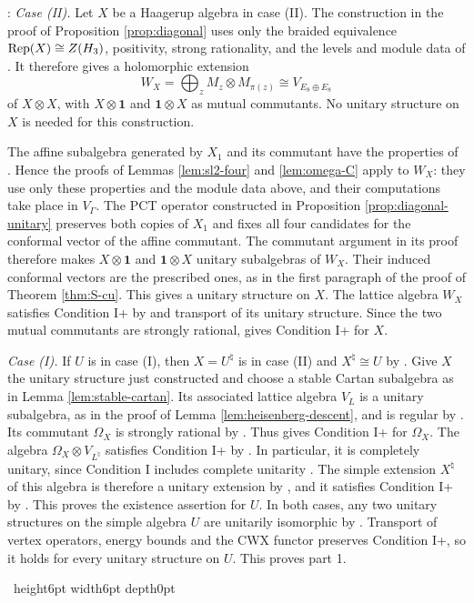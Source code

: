 \documentclass[leqno]{article}
\let\cal\relax
\newcommand{\cal}{\mathcal}
\newcommand{\qed}{\hfill \vrule height6pt  width6pt depth0pt}
\newcommand{\ot}{\otimes}
\DeclareMathOperator{\Rep}{Rep} %
\newenvironment{proof}[1][]{\noindent {\it Proof #1} : }{\hbox{~}\qed
\smallskip
}
\numberwithin{equation}{section}
\begin{document}
\begin{proof}
\emph{Case (II).} Let $X$ be a Haagerup algebra in case (II). The construction in the proof of Proposition \ref{prop:diagonal} uses only the braided equivalence $\Rep(X) \cong Z(\cal H_3)$, positivity, strong rationality, and the levels and module data of \cite[(4.1), Theorem 8.5 and Table 2]{Arh26}. It therefore gives a holomorphic extension
\[
W_X = \bigoplus_z M_z \ot M_{\pi(z)} \cong V_{E_8 \oplus E_8}
\]
of $X \ot X$, with $X \ot \mathbf 1$ and $\mathbf 1 \ot X$ as mutual commutants. No unitary structure on $X$ is needed for this construction.

The affine subalgebra generated by $X_1$ and its commutant have the properties of \cite[Corollary 9.2]{Arh26}. Hence the proofs of Lemmas \ref{lem:sl2-four} and \ref{lem:omega-C} apply to $W_X$: they use only these properties and the module data above, and their computations take place in $V_\Gamma$. The PCT operator constructed in Proposition \ref{prop:diagonal-unitary} preserves both copies of $X_1$ and fixes all four candidates for the conformal vector of the affine commutant. The commutant argument in its proof therefore makes $X \ot \mathbf 1$ and $\mathbf 1 \ot X$ unitary subalgebras of $W_X$. Their induced conformal vectors are the prescribed ones, as in the first paragraph of the proof of Theorem \ref{thm:S-cu}. This gives a unitary structure on $X$. The lattice algebra $W_X$ satisfies Condition I+ by \cite[Example 6.19(b) p.~71]{Gui25} and transport of its unitary structure. Since the two mutual commutants are strongly rational, \cite[Theorem 6.18(3) p.~70]{Gui25} gives Condition I+ for $X$.

\emph{Case (I).} If $U$ is in case (I), then $X = U^\natural$ is in case (II) and $X^\natural \cong U$ by \cite[Theorem 12.3, parts 1 and 3]{Arh26}. Give $X$ the unitary structure just constructed and choose a stable Cartan subalgebra as in Lemma \ref{lem:stable-cartan}. Its associated lattice algebra $V_L$ is a unitary subalgebra, as in the proof of Lemma \ref{lem:heisenberg-descent}, and is regular by \cite[Corollary 3.32 p.~49]{Gui22}. Its commutant $\Omega_X$ is strongly rational by \cite[Proposition 12.2]{Arh26}. Thus \cite[Theorem 6.18(3) p.~70]{Gui25} gives Condition I+ for $\Omega_X$. The algebra $\Omega_X \ot V_{L^\natural}$ satisfies Condition I+ by \cite[Theorem 6.18(1) and Example 6.19(b) pp.~70--71]{Gui25}. In particular, it is completely unitary, since Condition I includes complete unitarity \cite[Definition 4.15 p.~41]{Gui25}. The simple extension $X^\natural$ of this algebra is therefore a unitary extension by \cite[Theorem 4.7 p.~19]{CGGH23}, and it satisfies Condition I+ by \cite[Theorem 6.18(2) p.~70]{Gui25}. This proves the existence assertion for $U$. In both cases, any two unitary structures on the simple algebra $U$ are unitarily isomorphic by \cite[Proposition 5.19 pp.~40--41]{CKLW18}. Transport of vertex operators, energy bounds and the CWX functor preserves Condition I+, so it holds for every unitary structure on $U$. This proves part 1.


\end{proof}
\end{document}

